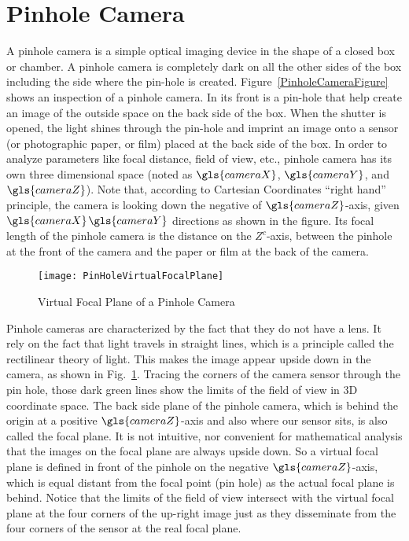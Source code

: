 \section{Pinhole Camera}
\label{sectionPinholeCamera}
\indent
A pinhole camera is a simple optical imaging device in the shape of a closed box or chamber. A pinhole camera is completely dark on all the other sides of the box including the side where the pin-hole is created. Figure~\ref{PinholeCameraFigure} shows an inspection of a pinhole camera. In its front is a pin-hole that help create an image of the outside space on the back side of the box. When the shutter is opened, the light shines through the pin-hole and imprint an image onto a sensor (or photographic paper, or film) placed at the back side of the box. In order to analyze parameters like focal distance, field of view, etc., pinhole camera has its own three dimensional space (noted as \(\gls{cameraX}\), \(\gls{cameraY}\), and \(\gls{cameraZ}\)). Note that, according to Cartesian Coordinates \enquote{right hand} principle, the camera is looking down the negative of \(\gls{cameraZ}\)-axis, given \(\gls{cameraX}\)\(\gls{cameraY}\) directions as shown in the figure. Its focal length of the pinhole camera is the distance on the \(Z^c\)-axis, between the pinhole at the front of the camera and the paper or film at the back of the camera.
\\\indent
\begin{figure}[!t]
\centering
\texttt{[image: PinHoleVirtualFocalPlane]}
\caption{Virtual Focal Plane of a Pinhole Camera}
\label{PinHoleVirtualFocalPlane}
\end{figure}%
%
%
Pinhole cameras are characterized by the fact that they do not have a lens. It rely on the fact that light travels in straight lines, which is a principle called the rectilinear theory of light. This makes the image appear upside down in the camera, as shown in Fig.~\ref{PinHoleVirtualFocalPlane}. Tracing the corners of the camera sensor through the pin hole, those dark green lines show the limits of the field of view in \gls{3D} coordinate space. The back side plane of the pinhole camera, which is behind the origin at a positive \(\gls{cameraZ}\)-axis and also where our sensor sits, is also called the focal plane. It is not intuitive, nor convenient for mathematical analysis that the images on the focal plane are always upside down. So a virtual focal plane is defined in front of the pinhole on the negative \(\gls{cameraZ}\)-axis, which is equal distant from the focal point (pin hole) as the actual focal plane is behind. Notice that the limits of the field of view intersect with the virtual focal plane at the four corners of the up-right image just as they disseminate from the four corners of the sensor at the real focal plane.

